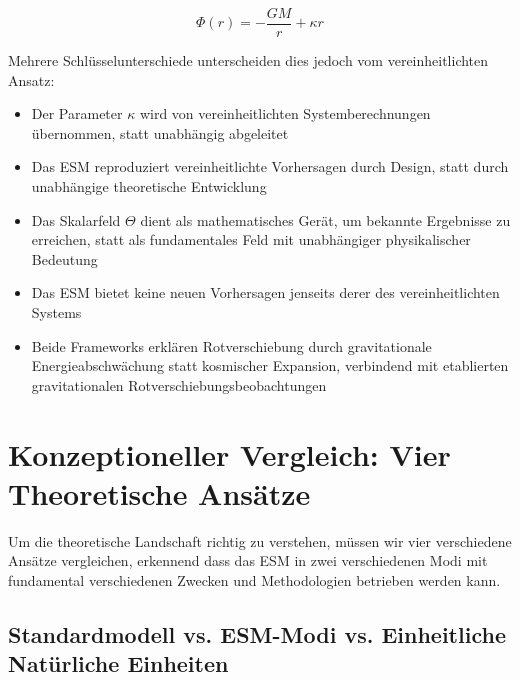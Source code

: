 	\begin{equation}
		\Phi(r) = -\frac{GM}{r} + \kappa r
	\end{equation}
	
	Mehrere Schlüsselunterschiede unterscheiden dies jedoch vom vereinheitlichten Ansatz:
	
	\begin{itemize}
		\item Der Parameter $\kappa$ wird von vereinheitlichten Systemberechnungen übernommen, statt unabhängig abgeleitet
		\item Das ESM reproduziert vereinheitlichte Vorhersagen durch Design, statt durch unabhängige theoretische Entwicklung
		\item Das Skalarfeld $\Theta$ dient als mathematisches Gerät, um bekannte Ergebnisse zu erreichen, statt als fundamentales Feld mit unabhängiger physikalischer Bedeutung
		\item Das ESM bietet keine neuen Vorhersagen jenseits derer des vereinheitlichten Systems
		\item Beide Frameworks erklären Rotverschiebung durch gravitationale Energieabschwächung statt kosmischer Expansion, verbindend mit etablierten gravitationalen Rotverschiebungsbeobachtungen
	\end{itemize}
	
	\section{Konzeptioneller Vergleich: Vier Theoretische Ansätze}
	\label{sec:four_framework_comparison}
	
	Um die theoretische Landschaft richtig zu verstehen, müssen wir vier verschiedene Ansätze vergleichen, erkennend dass das ESM in zwei verschiedenen Modi mit fundamental verschiedenen Zwecken und Methodologien betrieben werden kann.
	
	\subsection{Standardmodell vs. ESM-Modi vs. Einheitliche Natürliche Einheiten}
	\label{subsec:four_way_comparison}
	
